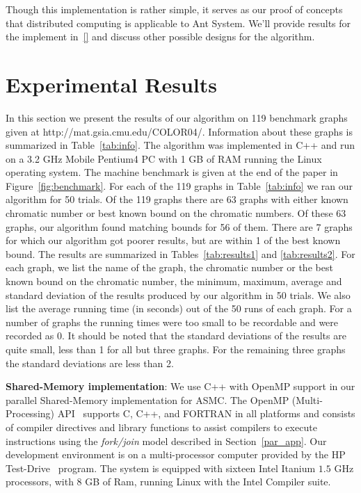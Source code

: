 \documentclass[11pt]{article}
\begin{document}
Though this implementation is rather simple, it serves as our proof of concepts that distributed computing is applicable to Ant System.  We'll provide results for the implement in~\ref{} and discuss other possible designs for the algorithm.



\section{Experimental Results}\label{results}

In this section we present the results of our algorithm on 119 benchmark
graphs given at http://mat.gsia.cmu.edu/COLOR04/.  Information about these
graphs is summarized in Table~\ref{tab:info}.  The algorithm was implemented
in C++ and run on a 3.2 GHz Mobile Pentium4 PC with 1 GB of RAM running the
Linux operating system.  The machine benchmark is given at the end of the
paper in Figure~\ref{fig:benchmark}.  For each of the 119 graphs in
Table~\ref{tab:info} we ran our algorithm for 50 trials.  Of the 119 graphs
there are 63 graphs with either known chromatic number or best known bound on
the chromatic numbers.  Of these 63 graphs, our algorithm found matching
bounds for 56 of them. There are 7 graphs for which our algorithm got poorer
results, but are within 1 of the best known bound.  The results are summarized
in Tables~\ref{tab:results1} and \ref{tab:results2}.  For each graph, we list
the name of the graph, the chromatic number or the best known bound on the
chromatic number, the minimum, maximum, average and standard deviation of the
results produced by our algorithm in 50 trials.  We also list the average
running time (in seconds) out of the 50 runs of each graph.  For a number of
graphs the running times were too small to be recordable and were recorded as
0.  It should be noted that the standard deviations of the results are quite
small, less than 1 for all but three graphs.  For the remaining three graphs
the standard deviations are less than 2.



\textbf{Shared-Memory implementation}: We use C++ with OpenMP support in our parallel Shared-Memory implementation for ASMC. The OpenMP (Multi-Processing) API~\cite{OpenMP} supports C, C++, and FORTRAN in all platforms and consists of compiler directives and library functions to assist compilers to execute instructions using the \textit{fork/join} model described in Section~\ref{par_app}.  Our development environment is on a multi-processor computer provided by the HP Test-Drive~\cite{HP_Testdrive} program. The system is equipped with sixteen Intel Itanium $1.5$ GHz processors, with $8$ GB of Ram, running Linux with the Intel Compiler suite. 
\end{document}
